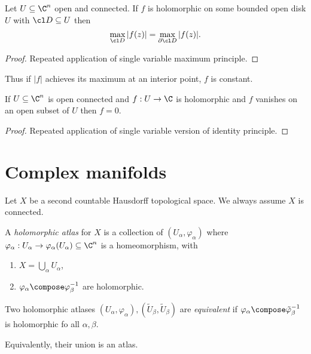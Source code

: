 \documentclass[a4paper]{article}
\begin{document}
\begin{proposition}
  Let \(U \subseteq \C^n\) open and connected. If \(f\) is holomorphic on some bounded open disk \(U\) with \(\cl D \subseteq U\) then
  \[
    \max_{\cl D} |f(z)| = \max_{\partial \cl D} |f(z)|.
  \]
\end{proposition}

\begin{proof}
  Repeated application of single variable maximum principle.
\end{proof}

Thus if \(|f|\) achieves its maximum at an interior point, \(f\) is constant.

\begin{proposition}
  If \(U \subseteq \C^n\) is open connected and \(f: U \to \C\) is holomorphic and \(f\) vanishes on an open subset of \(U\) then \(f = 0\).
\end{proposition}

\begin{proof}
  Repeated application of single variable version of identity principle.
\end{proof}

\section{Complex manifolds}

Let \(X\) be a second countable Hausdorff topological space. We always assume \(X\) is connected.

\begin{definition}
  A \emph{holomorphic atlas} for \(X\) is a collection of \((U_\alpha, \varphi_\alpha)\) where \(\varphi_\alpha: U_\alpha \to \varphi_\alpha(U_\alpha) \subseteq \C^n\) is a homeomorphism, with
  \begin{enumerate}
  \item \(X = \bigcup_\alpha U_\alpha\),
  \item \(\varphi_\alpha \compose \varphi_\beta^{-1}\) are holomorphic.
  \end{enumerate}
\end{definition}

\begin{definition}
  Two holomorphic atlases \((U_\alpha, \varphi_\alpha), (\tilde U_\beta, \tilde U_\beta)\) are \emph{equivalent} if \(\varphi_\alpha \compose \tilde \varphi_\beta^{-1}\) is holomorphic fo all \(\alpha, \beta\).

  Equivalently, their union is an atlas.
\end{definition}
\end{document}

